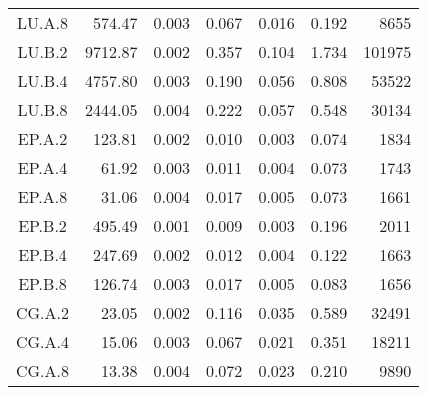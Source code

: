 \documentclass[../Main/thesis.tex]{subfiles}
\begin{document}
\begin{longtable}[c]{c*{6}{r}}
  LU.A.8                       & 574.47                       & 0.003                        & 0.067                      & 0.016                        & 0.192 & 8655   \\
  LU.B.2                       & 9712.87                      & 0.002                        & 0.357                      & 0.104                        & 1.734 & 101975 \\
  LU.B.4                       & 4757.80                      & 0.003                        & 0.190                      & 0.056                        & 0.808 & 53522  \\
  LU.B.8                       & 2444.05                      & 0.004                        & 0.222                      & 0.057                        & 0.548 & 30134  \\
  EP.A.2                       & 123.81                       & 0.002                        & 0.010                      & 0.003                        & 0.074 & 1834   \\
  EP.A.4                       & 61.92                        & 0.003                        & 0.011                      & 0.004                        & 0.073 & 1743   \\
  EP.A.8                       & 31.06                        & 0.004                        & 0.017                      & 0.005                        & 0.073 & 1661   \\
  EP.B.2                       & 495.49                       & 0.001                        & 0.009                      & 0.003                        & 0.196 & 2011   \\
  EP.B.4                       & 247.69                       & 0.002                        & 0.012                      & 0.004                        & 0.122 & 1663   \\
  EP.B.8                       & 126.74                       & 0.003                        & 0.017                      & 0.005                        & 0.083 & 1656   \\
  CG.A.2                       & 23.05                        & 0.002                        & 0.116                      & 0.035                        & 0.589 & 32491  \\
  CG.A.4                       & 15.06                        & 0.003                        & 0.067                      & 0.021                        & 0.351 & 18211  \\
  CG.A.8                       & 13.38                        & 0.004                        & 0.072                      & 0.023                        & 0.210 & 9890   \\

\end{longtable}
\end{document}

